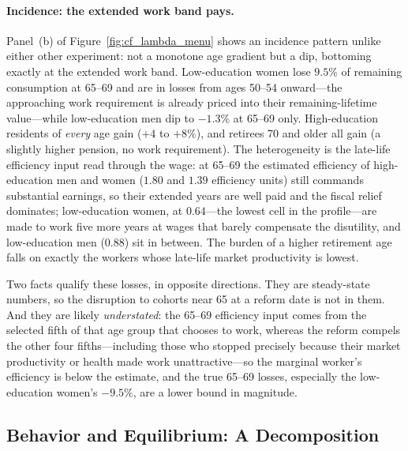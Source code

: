 \documentclass[12pt,a4paper]{article}
\begin{document}
\paragraph{Incidence: the extended work band pays.} Panel~(b) of Figure~\ref{fig:cf_lambda_menu} shows an incidence pattern unlike either other experiment: not a monotone age gradient but a dip, bottoming exactly at the extended work band. Low-education women lose $9.5\%$ of remaining consumption at 65--69 and are in losses from ages 50--54 onward---the approaching work requirement is already priced into their remaining-lifetime value---while low-education men dip to $-1.3\%$ at 65--69 only. High-education residents of \emph{every} age gain ($+4$ to $+8\%$), and retirees 70 and older all gain (a slightly higher pension, no work requirement). The heterogeneity is the late-life efficiency input read through the wage: at 65--69 the estimated efficiency of high-education men and women ($1.80$ and $1.39$ efficiency units) still commands substantial earnings, so their extended years are well paid and the fiscal relief dominates; low-education women, at $0.64$---the lowest cell in the profile---are made to work five more years at wages that barely compensate the disutility, and low-education men ($0.88$) sit in between. The burden of a higher retirement age falls on exactly the workers whose late-life market productivity is lowest.

Two facts qualify these losses, in opposite directions. They are steady-state numbers, so the disruption to cohorts near 65 at a reform date is not in them. And they are likely \emph{understated}: the 65--69 efficiency input comes from the selected fifth of that age group that chooses to work, whereas the reform compels the other four fifths---including those who stopped precisely because their market productivity or health made work unattractive---so the marginal worker's efficiency is below the estimate, and the true 65--69 losses, especially the low-education women's $-9.5\%$, are a lower bound in magnitude.

\subsection{Behavior and Equilibrium: A Decomposition}
\label{subsec:cf_decomposition}
\end{document}
